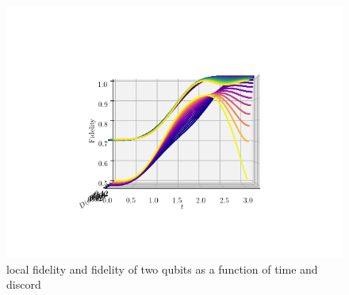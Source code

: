 \documentclass[a4paper,11pt]{scrartcl}
\begin{document}
\begin{figure}
    \centering
    \includegraphics[width=\textwidth]{twoqubit_and_local_fidelity_of_t_against_discord.png}
    \caption{local fidelity and fidelity of two qubits as a function of time and discord}
    \label{fig:3dplot-fid-of-disc}
\end{figure}



\printbibliography
\end{document}
